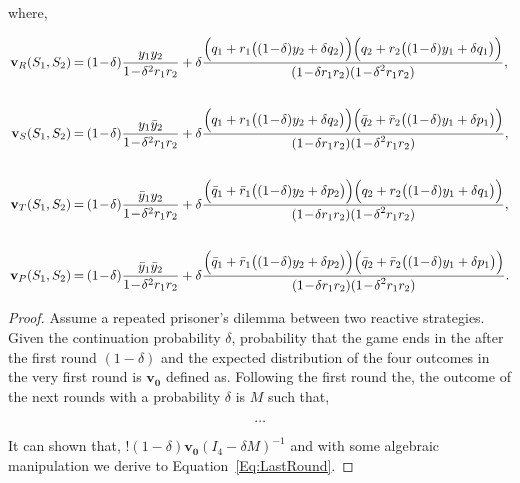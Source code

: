 \documentclass[11pt]{article}
\theoremstyle{plainCl1}
\theoremstyle{plainCl2}
\begin{document}
where,

\begin{equation} \label{Eq:LastRound}
    \setlength{\arraycolsep}{1pt}
    \begin{array}{rcl}

    \mathbf{v}_{R}(S_1,S_2) &= &\displaystyle (1\!-\!\delta)\frac{y_1y_2}{1\!-\!\delta^2 r_1 r_2}+\delta \frac{\Big(q_1+r_1\big((1\!-\!\delta)y_2+\delta q_2\big)\Big) \Big(q_2+r_2\big((1\!-\!\delta)y_1+\delta q_1\big)\Big)}
    {\displaystyle(1\!-\!\delta r_1r_2)(1\!-\!\delta^2 r_1 r_2)},\\[1cm]

    \mathbf{v}_{S}(S_1,S_2) &= &\displaystyle (1\!-\!\delta)\frac{y_1\bar{y}_2}{1\!-\!\delta^2 r_1 r_2}+\delta \frac{\Big(q_1+r_1\big((1\!-\!\delta)y_2+\delta q_2\big)\Big) \Big(\bar{q}_2+\bar{r}_2\big((1\!-\!\delta)y_1+\delta p_1\big)\Big)}
    {\displaystyle(1\!-\!\delta r_1r_2)(1\!-\!\delta^2 r_1 r_2)},\\[1cm]

    \mathbf{v}_{T}(S_1,S_2) &= &\displaystyle (1\!-\!\delta)\frac{\bar{y}_1y_2}{1\!-\!\delta^2 r_1 r_2}+\delta \frac{\Big(\bar{q}_1+\bar{r}_1\big((1\!-\!\delta)y_2+\delta p_2\big)\Big) \Big(q_2+r_2\big((1\!-\!\delta)y_1+\delta q_1\big)\Big)}
    {\displaystyle(1\!-\!\delta r_1r_2)(1\!-\!\delta^2 r_1 r_2)},\\[1cm]

    \mathbf{v}_{P}(S_1,S_2) &= &\displaystyle (1\!-\!\delta)\frac{\bar{y}_1\bar{y}_2}{1\!-\!\delta^2 r_1 r_2}+\delta \frac{\Big(\bar{q}_1+\bar{r}_1\big((1\!-\!\delta)y_2+\delta p_2\big)\Big) \Big(\bar{q}_2+\bar{r}_2\big((1\!-\!\delta)y_1+\delta p_1\big)\Big)}
    {\displaystyle(1\!-\!\delta r_1r_2)(1\!-\!\delta^2 r_1 r_2)}.
    \end{array}
\end{equation}

\begin{proof}

Assume a repeated prisoner's dilemma between two reactive strategies. Given the
continuation probability $\delta$, probability that the game ends in the after
the first round $(1 - \delta)$ and the expected distribution of the four
outcomes in the very first round is $\mathbf{v_0}$ defined as. Following the
first round the, the outcome of the next rounds with a probability $\delta$
is \(M\) such that,

\[\dots\]

It can shown that, \(!(1\!-\!\delta)\mathbf{v_0}(I_4-\delta M)^{-1}\) and with
some algebraic manipulation we derive to Equation~\ref{Eq:LastRound}.

\end{proof}
\end{document}
